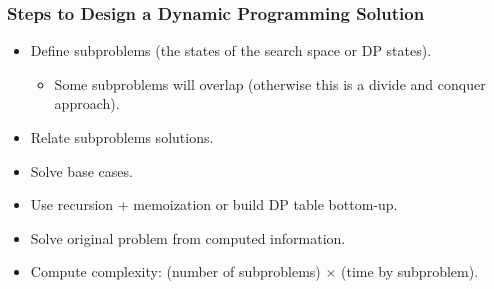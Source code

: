 \documentclass{beamer}
\begin{document}
\begin{frame}%
\frametitle{Steps to Design a Dynamic Programming Solution}

\begin{itemize}

\item Define subproblems (the states of the search space or DP states).
\begin{itemize}
\item Some subproblems will overlap (otherwise this is a divide and conquer approach).
\end{itemize}

\vspace{0.2cm}

\item<2-> Relate subproblems solutions.

\vspace{0.2cm}

\item<3-> Solve base cases.

\vspace{0.2cm}

\item<4-> Use recursion + memoization or build DP table bottom-up.

\vspace{0.2cm}

\item<5-> Solve original problem from computed information.

\vspace{0.2cm}

\item<6-> Compute complexity: (number of subproblems) $\times$ (time by subproblem).

\end{itemize}

\end{frame}
\end{document}
